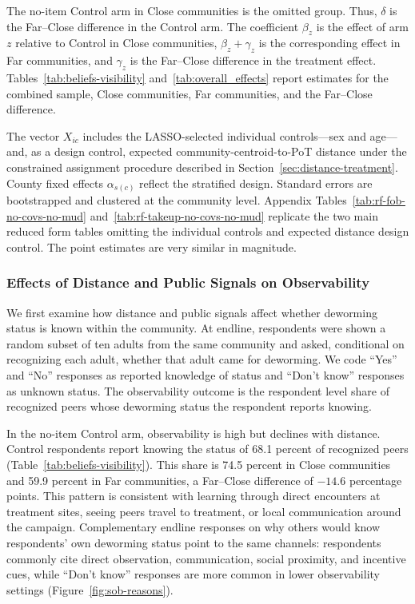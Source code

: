\documentclass[ECM\space ReStud.tex]{subfiles}
\begin{document}
The no-item Control arm in Close communities is the omitted group. Thus, \(\delta\) is the Far--Close difference in the Control arm. The coefficient \(\beta_z\) is the effect of arm \(z\) relative to Control in Close communities, \(\beta_z+\gamma_z\) is the corresponding effect in Far communities, and \(\gamma_z\) is the Far--Close difference in the treatment effect. Tables~\ref{tab:beliefs-visibility} and~\ref{tab:overall_effects} report estimates for the combined sample, Close communities, Far communities, and the Far--Close difference.

The vector \(X_{ic}\) includes the LASSO-selected individual controls---sex and age---and, as a design control, expected community-centroid-to-PoT distance under the constrained assignment procedure described in Section~\ref{sec:distance-treatment}. County fixed effects \(\alpha_{s(c)}\) reflect the stratified design. Standard errors are bootstrapped and clustered at the community level. Appendix Tables~\ref{tab:rf-fob-no-covs-no-mud} and~\ref{tab:rf-takeup-no-covs-no-mud} replicate the two main reduced form tables omitting the individual controls and expected distance design control. The point estimates are very similar in magnitude.

\subsubsection{Effects of Distance and Public Signals on Observability}

We first examine how distance and public signals affect whether deworming status is known within the community. At endline, respondents were shown a random subset of ten adults from the same community and asked, conditional on recognizing each adult, whether that adult came for deworming. We code ``Yes'' and ``No'' responses as reported knowledge of status and ``Don't know'' responses as unknown status. The observability outcome is the respondent level share of recognized peers whose deworming status the respondent reports knowing.

In the no-item Control arm, observability is high but declines with distance. Control respondents report knowing the status of 68.1 percent of recognized peers (Table~\ref{tab:beliefs-visibility}). This share is 74.5 percent in Close communities and 59.9 percent in Far communities, a Far--Close difference of $-14.6$ percentage points. This pattern is consistent with learning through direct encounters at treatment sites, seeing peers travel to treatment, or local communication around the campaign. Complementary endline responses on why others would know respondents' own deworming status point to the same channels: respondents commonly cite direct observation, communication, social proximity, and incentive cues, while ``Don't know'' responses are more common in lower observability settings (Figure~\ref{fig:sob-reasons}).
\end{document}
